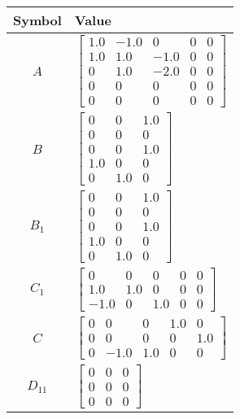 \begin{tabular}{cl}
\hline
  Symbol  & Value                                                                                                                                                   \\
\hline
   $A$    & $\left[\begin{matrix}1.0 & -1.0 & 0 & 0 & 0\\1.0 & 1.0 & -1.0 & 0 & 0\\0 & 1.0 & -2.0 & 0 & 0\\0 & 0 & 0 & 0 & 0\\0 & 0 & 0 & 0 & 0\end{matrix}\right]$ \\
   $B$    & $\left[\begin{matrix}0 & 0 & 1.0\\0 & 0 & 0\\0 & 0 & 1.0\\1.0 & 0 & 0\\0 & 1.0 & 0\end{matrix}\right]$                                                  \\
 $B_{1}$  & $\left[\begin{matrix}0 & 0 & 1.0\\0 & 0 & 0\\0 & 0 & 1.0\\1.0 & 0 & 0\\0 & 1.0 & 0\end{matrix}\right]$                                                  \\
 $C_{1}$  & $\left[\begin{matrix}0 & 0 & 0 & 0 & 0\\1.0 & 1.0 & 0 & 0 & 0\\-1.0 & 0 & 1.0 & 0 & 0\end{matrix}\right]$                                               \\
   $C$    & $\left[\begin{matrix}0 & 0 & 0 & 1.0 & 0\\0 & 0 & 0 & 0 & 1.0\\0 & -1.0 & 1.0 & 0 & 0\end{matrix}\right]$                                               \\
 $D_{11}$ & $\left[\begin{matrix}0 & 0 & 0\\0 & 0 & 0\\0 & 0 & 0\end{matrix}\right]$                                                                                \\

\end{tabular}
